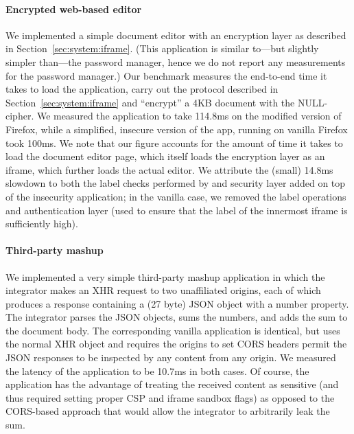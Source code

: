 \paragraph{Encrypted web-based editor}

We implemented a simple document editor with an encryption layer as
described in Section~\ref{sec:system:iframe}.
%
(This application is similar to---but slightly simpler than---the
password manager, hence we do not report any measurements for the
password manager.)
%
Our benchmark measures the end-to-end time it takes to load the
application, carry out the protocol described in
Section~\ref{sec:system:iframe}  and ``encrypt'' a 4KB document with
the NULL-cipher.
%
We measured the \sys{} application to take 114.8ms on the modified
version of Firefox, while a simplified, insecure version of the app,
running on vanilla Firefox took 100ms.
%
We note that our figure accounts for the amount of time it takes to
load the document editor page, which itself loads the encryption layer
as an iframe, which further loads the actual editor.
%
We attribute the (small) 14.8ms slowdown to both the label checks
performed by \sys{} and security layer added on top of the insecurity
application; in the vanilla case, we removed the label operations and
authentication layer (used to ensure that the label of the innermost
iframe is sufficiently high).


\paragraph{Third-party mashup}

We implemented a very simple third-party mashup application in which
the integrator makes an XHR request to two unaffiliated origins, each
of which produces a response containing a (27 byte) JSON object with a
number property.
%
The integrator parses the JSON objects, sums the numbers, and adds the
sum to the document body.
%
The corresponding vanilla application is identical, but uses the
normal XHR object and requires the origins to set CORS headers permit
the JSON responses to be inspected by any content from any origin.
%
We measured the latency of the application to be 10.7ms in both cases.
%
Of course, the \sys{} application has the advantage of treating the
received content as sensitive (and thus required setting proper CSP
and iframe sandbox flags) as opposed to the CORS-based approach that
would allow the integrator to arbitrarily leak the sum.

